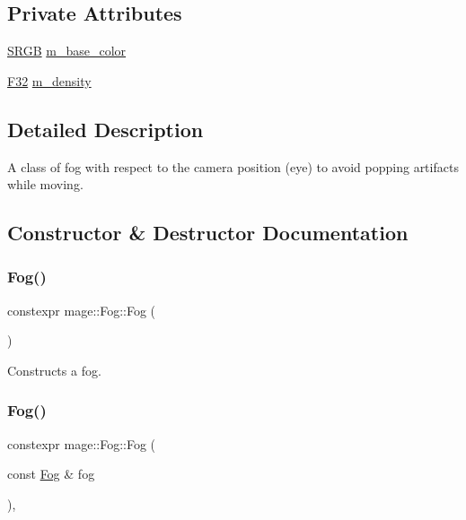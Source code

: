 \subsection*{Private Attributes}
\begin{DoxyCompactItemize}
\item 
\hyperlink{structmage_1_1_s_r_g_b}{S\+R\+GB} \hyperlink{classmage_1_1_fog_a8b7ddd68efcb241c10b4e82228b914ee}{m\+\_\+base\+\_\+color}
\item 
\hyperlink{namespacemage_aa97e833b45f06d60a0a9c4fc22ae02c0}{F32} \hyperlink{classmage_1_1_fog_a61e5b808bd2d800ec3a33f202e834814}{m\+\_\+density}
\end{DoxyCompactItemize}


\subsection{Detailed Description}
A class of fog with respect to the camera position (eye) to avoid popping artifacts while moving. 

\subsection{Constructor \& Destructor Documentation}
\hypertarget{classmage_1_1_fog_ae8108fc4d2fd88a13184ed10fed77603}{}\label{classmage_1_1_fog_ae8108fc4d2fd88a13184ed10fed77603} 
\subsubsection{\texorpdfstring{Fog()}{Fog()}\hspace{0.1cm}{\footnotesize\ttfamily [1/3]}}
{\footnotesize\ttfamily constexpr mage\+::\+Fog\+::\+Fog (\begin{DoxyParamCaption}{ }\end{DoxyParamCaption})\hspace{0.3cm}{\ttfamily [noexcept]}}

Constructs a fog. \hypertarget{classmage_1_1_fog_acf8d56179a99195dd494c75c05a657e6}{}\label{classmage_1_1_fog_acf8d56179a99195dd494c75c05a657e6} 
\subsubsection{\texorpdfstring{Fog()}{Fog()}\hspace{0.1cm}{\footnotesize\ttfamily [2/3]}}
{\footnotesize\ttfamily constexpr mage\+::\+Fog\+::\+Fog (\begin{DoxyParamCaption}\item[{const \hyperlink{classmage_1_1_fog}{Fog} \&}]{fog }\end{DoxyParamCaption})\hspace{0.3cm}{\ttfamily [default]}, {\ttfamily [noexcept]}}

